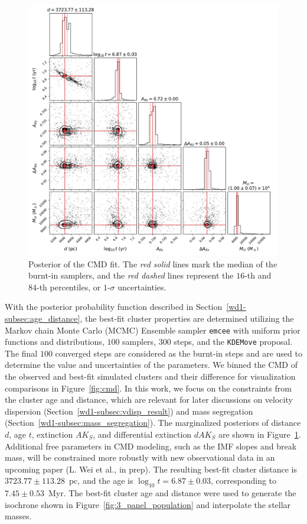 \documentclass[12pt]{ucsddissertation}
\begin{document}
\begin{CJK*}{UTF8}{gbsn}
\begin{figure}[htb!]
    \centering
    \includegraphics[width=0.7\linewidth]{figures/chapter2/imf_corner_marginalized.pdf}
    \caption[Posterior of the CMD fit]{Posterior of the CMD fit. The {\em red solid} lines mark the median of the burnt-in samplers, and the {\em red dashed} lines represent the $16$-th and $84$-th percentiles, or $1$-$\sigma$ uncertainties.}
    \label{fig:imf_corner_marginalized}
\end{figure}

With the posterior probability function described in Section~\ref{wd1-subsec:age_distance}, the best-fit cluster properties are determined utilizing the Markov chain Monte Carlo (MCMC) Ensemble sampler \texttt{emcee} \citep[][]{emcee} with uniform prior functions and distributions, $100$ samplers, $300$ steps, and the \texttt{KDEMove} proposal. The final $100$ converged steps are considered as the burnt-in steps and are used to determine the value and uncertainties of the parameters. We binned the CMD of the observed and best-fit simulated clusters and their difference for visualization comparisons in Figure~\ref{fig:cmd}. In this work, we focus on the constraints from the cluster age and distance, which are relevant for later discussions on velocity dispersion (Section~\ref{wd1-subsec:vdisp_result}) and mass segregation (Section~\ref{wd1-subsec:mass_segregation}). The marginalized posteriors of distance $d$, age $t$, extinction $AK_S$, and differential extinction $dAK_S$ are shown in Figure~\ref{fig:imf_corner_marginalized}. Additional free parameters in CMD modeling, such as the IMF slopes and break mass,  will be constrained more robustly with new observational data in an upcoming paper (L. Wei et al., in prep). The resulting best-fit cluster distance is $3723.77\pm113.28$~pc, and the age is $\log_{10}t = 6.87 \pm 0.03$, corresponding to $7.45 \pm 0.53$~Myr. The best-fit cluster age and distance were used to generate the isochrone shown in Figure~\ref{fig:3_panel_population} and interpolate the stellar masses.




\end{CJK*}
\end{document}
